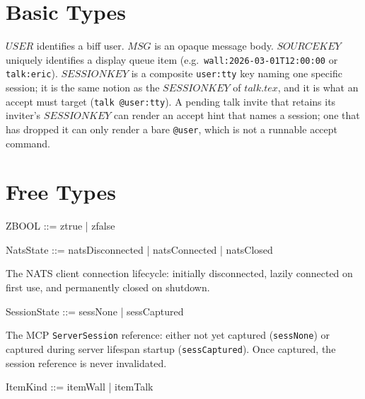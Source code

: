 \documentclass[a4paper,10pt,fleqn]{article}
\begin{document}
\section{Basic Types}

\begin{zed}
\end{zed}

$USER$ identifies a biff user.  $MSG$ is an opaque message body.
$SOURCEKEY$ uniquely identifies a display queue item (e.g.\
\texttt{wall:2026-03-01T12:00:00} or \texttt{talk:eric}).
$SESSIONKEY$ is a composite \texttt{user:tty} key naming one specific
session; it is the same notion as the $SESSIONKEY$ of $talk.tex$, and it
is what an accept must target (\texttt{talk @user:tty}).  A pending talk
invite that retains its inviter's $SESSIONKEY$ can render an accept hint
that names a session; one that has dropped it can only render a bare
\texttt{@user}, which is not a runnable accept command.

\section{Free Types}

\begin{zed}
  ZBOOL ::= ztrue | zfalse
\end{zed}

\begin{zed}
  NatsState ::= natsDisconnected | natsConnected | natsClosed
\end{zed}

The NATS client connection lifecycle: initially disconnected, lazily
connected on first use, and permanently closed on shutdown.

\begin{zed}
  SessionState ::= sessNone | sessCaptured
\end{zed}

The MCP \texttt{ServerSession} reference: either not yet captured
(\texttt{sessNone}) or captured during server lifespan startup
(\texttt{sessCaptured}).  Once captured, the session reference
is never invalidated.

\begin{zed}
  ItemKind ::= itemWall | itemTalk
\end{zed}
\end{document}
